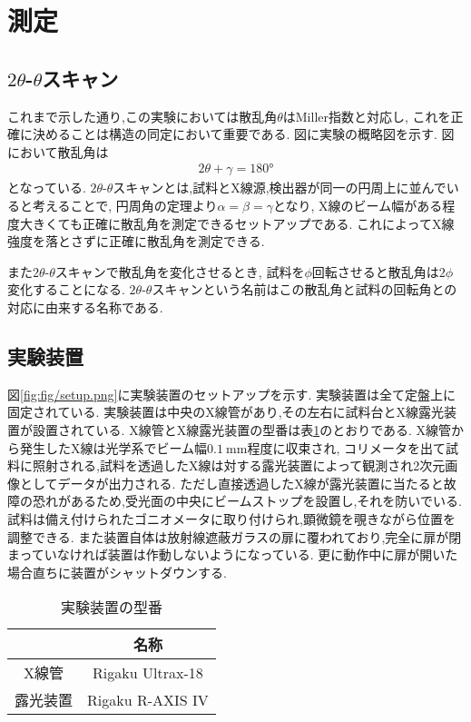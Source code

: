 \section{測定}
\subsection{$2\theta$-$\theta$スキャン}
これまで示した通り,この実験においては散乱角$\theta$はMiller指数と対応し,
これを正確に決めることは構造の同定において重要である.
図に実験の概略図を示す.
図において散乱角は
\begin{align}
  2\theta+\gamma=180\si{\degree}
\end{align}
となっている.
$2\theta$-$\theta$スキャンとは,試料とX線源,検出器が同一の円周上に並んでいると考えることで,
円周角の定理より$\alpha=\beta=\gamma$となり,
X線のビーム幅がある程度大きくても正確に散乱角を測定できるセットアップである.
これによってX線強度を落とさずに正確に散乱角を測定できる.

また$2\theta$-$\theta$スキャンで散乱角を変化させるとき,
試料を$\phi$回転させると散乱角は$2\phi$変化することになる.
$2\theta$-$\theta$スキャンという名前はこの散乱角と試料の回転角との対応に由来する名称である.
\subsection{実験装置}
図\ref{fig:fig/setup.png}に実験装置のセットアップを示す.
実験装置は全て定盤上に固定されている.
実験装置は中央のX線管があり,その左右に試料台とX線露光装置が設置されている.
X線管とX線露光装置の型番は表\ref{tab:souti}のとおりである.
X線管から発生したX線は光学系でビーム幅$0.1\ \si{\milli\metre}$程度に収束され,
コリメータを出て試料に照射される,試料を透過したX線は対する露光装置によって観測され2次元画像としてデータが出力される.
ただし直接透過したX線が露光装置に当たると故障の恐れがあるため,受光面の中央にビームストップを設置し,それを防いでいる.
試料は備え付けられたゴニオメータに取り付けられ,顕微鏡を覗きながら位置を調整できる.
また装置自体は放射線遮蔽ガラスの扉に覆われており,完全に扉が閉まっていなければ装置は作動しないようになっている.
更に動作中に扉が開いた場合直ちに装置がシャットダウンする.
\begin{table}[h]
  \caption{実験装置の型番}
  \label{tab:souti}
  \centering
  \begin{tabular}{cc}
  \hline
  &名称\\
  \hline \hline
  X線管&Rigaku Ultrax-18\\
  露光装置&Rigaku R-AXIS IV\\
  \hline
  \end{tabular}
\end{table}
